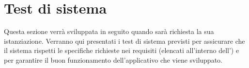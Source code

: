 \documentclass[PianoDiQualifica.tex]{subfiles}
\begin{document}
\chapter{Test di sistema}
Questa sezione verrà sviluppata in seguito quando sarà richiesta la sua istanziazione.
Verranno qui presentati i test di sistema previsti per assicurare che il sistema rispetti le specifiche richieste nei requisiti (elencati all'interno dell'\adr) e per garantire il buon funzionamento dell'applicativo che viene sviluppato.
\end{document}
